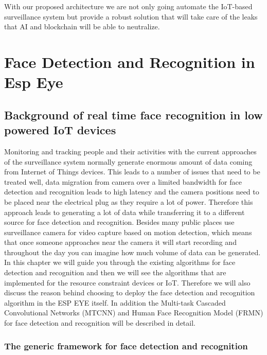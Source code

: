 With our proposed architecture we are not only going automate the IoT-based surveillance system but provide a robust solution that will take care of the leaks that AI and blockchain will be able to neutralize. 


\chapter{Face Detection and Recognition in Esp Eye}
\label{chap:face_detection}
\section{Background of real time face recognition in low powered IoT devices}
Monitoring and tracking people and their activities with the current approaches of the surveillance system normally generate enormous amount of data coming from Internet of Things devices. This leads to a number of issues that need to be treated well, data migration from camera over a limited bandwidth for face detection and recognition leads to high latency  and the camera positions need to be placed near the electrical plug as they require a lot of power. Therefore this approach leads to generating a lot of data while transferring it to a different source for face detection and recognition. Besides many public places use surveillance camera for video capture based on motion detection, which means that once someone approaches near the camera it will start recording and throughout the day you can imagine how much volume of data can be generated. 
In this chapter we will guide you through the existing algorithms for face detection and recognition and then we will see the algorithms that are implemented for the resource constraint devices or IoT. Therefore we will also discuss the reason behind choosing to deploy the face detection and recognition algorithm in the ESP EYE itself. In addition the Multi-task Cascaded Convolutional Networks (MTCNN) and  Human Face Recognition Model (FRMN) for face detection and recognition will be described in detail. 


\subsection{The generic framework for face detection and recognition}



